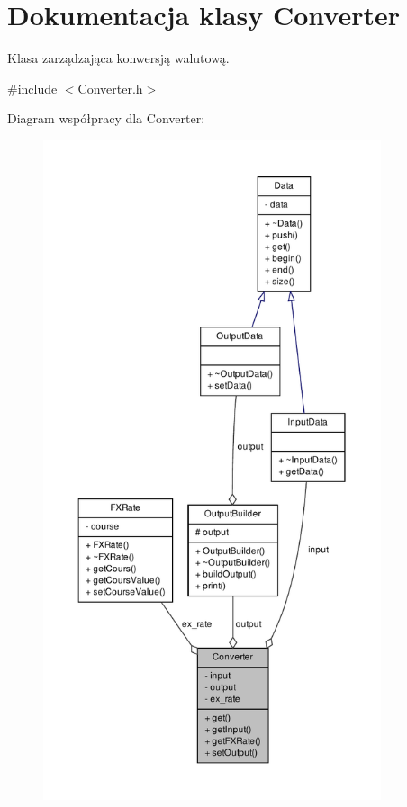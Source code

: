 \hypertarget{class_converter}{\section{\-Dokumentacja klasy \-Converter}
\label{class_converter}
}


\-Klasa zarządzająca konwersją walutową.  




{\ttfamily \#include $<$\-Converter.\-h$>$}



\-Diagram współpracy dla \-Converter\-:\nopagebreak
\begin{figure}[H]
\begin{center}
\leavevmode
\includegraphics[height=550pt]{class_converter__coll__graph}
\end{center}
\end{figure}
